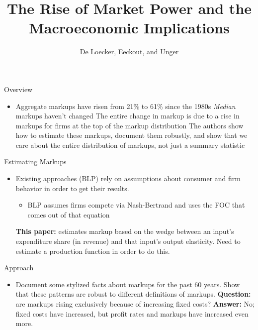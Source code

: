 \documentclass{beamer}
\title{The Rise of Market Power and the Macroeconomic Implications}
\author{De Loecker, Eeckout, and Unger}
\begin{document}
\maketitle

\begin{frame}{Overview}
  \begin{itemize}
  \item Aggregate markups have risen from 21\% to 61\% since the 1980s
    \vitem \emph{Median} markups haven't changed
    \vitem The entire change in markup is due to a rise in markups for firms at the top of the markup distribution
    \vitem The authors show how to estimate these markups, document them robustly, and show that we care about the entire distribution of markups, not just a summary statistic
  \end{itemize}
\end{frame}
%
\begin{frame}{Estimating Markups}
  \begin{itemize}
  \item Existing approaches (BLP) rely on assumptions about consumer and firm behavior in order to get their results.
    \begin{itemize}
    \item BLP assumes firms compete via Nash-Bertrand and uses the FOC that comes out of that equation
    \end{itemize}
    \vitem \textbf{This paper:} estimates markup based on the wedge between an input's expenditure share (in revenue) and that input's output elasticity.
    \vitem Need to estimate a production function in order to do this.
  \end{itemize}
\end{frame}
%
\begin{frame}{Approach}
  \begin{itemize}
  \item Document some stylized facts about markups for the past 60 years.
    \vitem Show that these patterns are robust to different definitions of markups.
    \vitem \textbf{Question:} are markups rising exclusively because of increasing fixed costs?
    \vitem \textbf{Answer:} No; fixed costs have increased, but profit rates and markups have increased even more.
  \end{itemize}
\end{frame}
%
\end{document}
